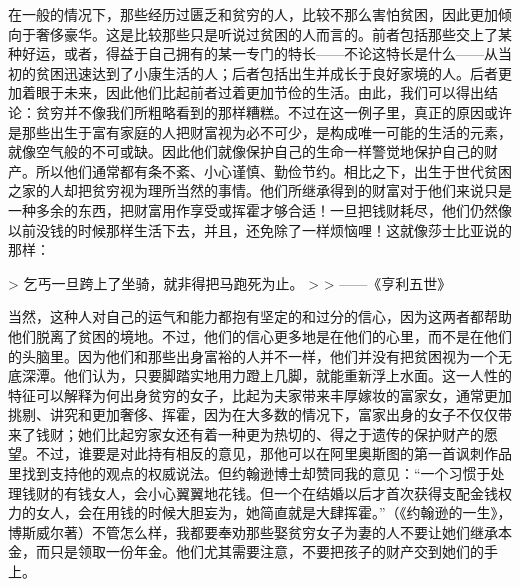 \documentclass[12pt,oneside]{book}
\begin{document}
在一般的情况下，那些经历过匮乏和贫穷的人，比较不那么害怕贫困，因此更加倾向于奢侈豪华。这是比较那些只是听说过贫困的人而言的。前者包括那些交上了某种好运，或者，得益于自己拥有的某一专门的特长——不论这特长是什么——从当初的贫困迅速达到了小康生活的人；后者包括出生并成长于良好家境的人。后者更加着眼于未来，因此他们比起前者过着更加节俭的生活。由此，我们可以得出结论：贫穷并不像我们所粗略看到的那样糟糕。不过在这一例子里，真正的原因或许是那些出生于富有家庭的人把财富视为必不可少，是构成唯一可能的生活的元素，就像空气般的不可或缺。因此他们就像保护自己的生命一样警觉地保护自己的财产。所以他们通常都有条不紊、小心谨慎、勤俭节约。相比之下，出生于世代贫困之家的人却把贫穷视为理所当然的事情。他们所继承得到的财富对于他们来说只是一种多余的东西，把财富用作享受或挥霍才够合适！一旦把钱财耗尽，他们仍然像以前没钱的时候那样生活下去，并且，还免除了一样烦恼哩！这就像莎士比亚说的那样： 

 

> 乞丐一旦跨上了坐骑，就非得把马跑死为止。 
>
> ——《亨利五世》 

 

当然，这种人对自己的运气和能力都抱有坚定的和过分的信心，因为这两者都帮助他们脱离了贫困的境地。不过，他们的信心更多地是在他们的心里，而不是在他们的头脑里。因为他们和那些出身富裕的人并不一样，他们并没有把贫困视为一个无底深潭。他们认为，只要脚踏实地用力蹬上几脚，就能重新浮上水面。这一人性的特征可以解释为何出身贫穷的女子，比起为夫家带来丰厚嫁妆的富家女，通常更加挑剔、讲究和更加奢侈、挥霍，因为在大多数的情况下，富家出身的女子不仅仅带来了钱财；她们比起穷家女还有着一种更为热切的、得之于遗传的保护财产的愿望。不过，谁要是对此持有相反的意见，那他可以在阿里奥斯图的第一首讽刺作品里找到支持他的观点的权威说法。但约翰逊博士却赞同我的意见：“一个习惯于处理钱财的有钱女人，会小心翼翼地花钱。但一个在结婚以后才首次获得支配金钱权力的女人，会在用钱的时候大胆妄为，她简直就是大肆挥霍。”（《约翰逊的一生》，博斯威尔著）不管怎么样，我都要奉劝那些娶贫穷女子为妻的人不要让她们继承本金，而只是领取一份年金。他们尤其需要注意，不要把孩子的财产交到她们的手上。 
\end{document}
